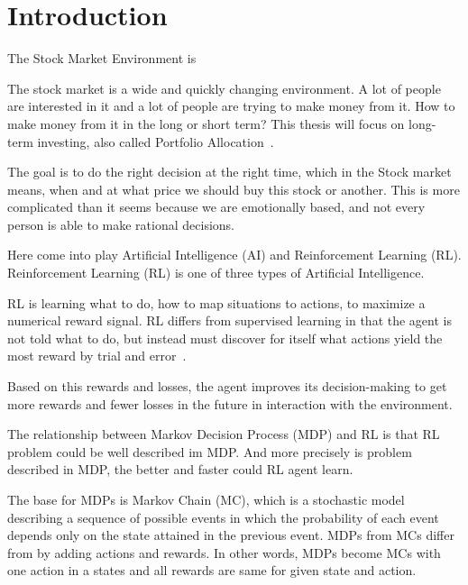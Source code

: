 

\chapter{Introduction}\label{ch:introduction}


The Stock Market Environment is

The stock market is a wide and quickly changing environment.
A lot of people are interested in it and a lot of people are trying to make money from it.
How to make money from it in the long or short term?
This thesis will focus on long-term investing, also called Portfolio Allocation~\cite[p.~67--69]{rao-2022}.

The goal is to do the right decision at the right time, which in the Stock market means, when and at what price we should buy this stock or another.
This is more complicated than it seems because we are emotionally
based, and not every person is able to make rational decisions.

Here come into play Artificial Intelligence (AI) and Reinforcement Learning (RL).
Reinforcement Learning (RL) is one of three types of Artificial Intelligence.

RL is learning what to do, how to map situations to actions, to maximize a numerical reward signal.
RL differs from supervised learning in that the agent is not told what to do,
but instead must discover for itself what actions yield the most
reward by trial and error~\cite[p.~1]{sutton-2018}.

Based on this rewards and losses, the agent improves its decision-making
to get more rewards and fewer losses in the future
in interaction with the environment.






The relationship between Markov Decision Process (MDP) and RL is
that RL problem could be well described im MDP\@.
And more precisely is problem described in MDP,
the better and faster could RL agent learn.

The base for MDPs is Markov Chain (MC),
which is a stochastic model describing a sequence of possible events in which the probability
of each event depends only on the state attained in the previous event.
MDPs from MCs differ from by adding actions and rewards.
In other words, MDPs become MCs with one action in a states and all rewards are same
for given state and action.

